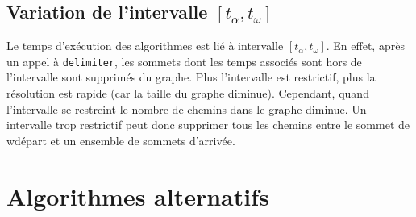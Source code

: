 \documentclass{article}
\begin{document}
\subsection{Variation de l'intervalle $[t_\alpha, t_\omega]$}
Le temps d'exécution des algorithmes est lié à intervalle $[t_\alpha, t_\omega]$.
En effet, après un appel à \texttt{delimiter}, les sommets dont les temps
associés sont hors de l'intervalle sont supprimés du graphe. Plus l'intervalle est
restrictif, plus la résolution est rapide (car la taille du graphe diminue).
Cependant, quand l'intervalle se restreint le nombre de chemins dans le graphe
diminue. Un intervalle trop restrictif peut donc supprimer tous les chemins entre
le sommet de wdépart et un ensemble de sommets d'arrivée.


\section{Algorithmes alternatifs}


\newpage
\end{document}
